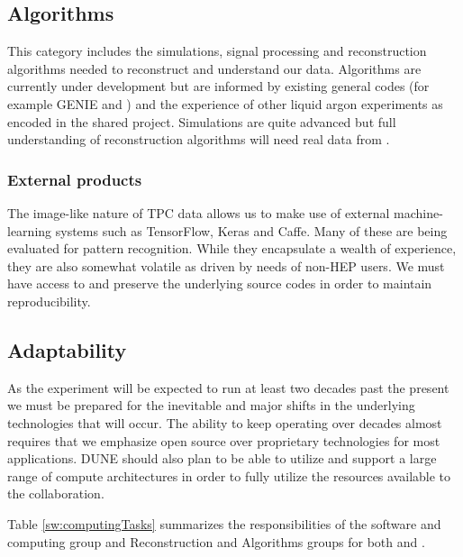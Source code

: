 \subsection{Algorithms}
This category includes the simulations, signal processing and reconstruction algorithms needed to reconstruct and understand our data. Algorithms are currently under development but are  informed by existing general codes (for example GENIE and ) and the experience of other liquid argon experiments as encoded in the shared   project.  Simulations are quite advanced but full understanding of reconstruction algorithms will need real data from . 

\subsubsection{External products}
The image-like nature of TPC data allows us to make use of external machine-learning systems such as TensorFlow\cite{DBLP:journals/corr/AbadiABBCCCDDDG16}, 
Keras\cite{chollet2015keras} and Caffe\cite{Jia:2014:CCA:2647868.2654889}.  Many of these are being evaluated for pattern recognition. While they encapsulate a wealth of experience, they are also somewhat volatile as driven by needs of non-HEP users.  We must have access to and preserve the underlying source codes in order to maintain reproducibility. 



\subsection{Adaptability}
As the experiment will be expected to run at least two decades past the present we must be prepared for the inevitable and major shifts in the underlying technologies that will occur. The ability to keep operating over decades almost requires that we emphasize open source over proprietary technologies for most applications.  DUNE should also plan to be able to utilize and support a large range of compute architectures in order to fully utilize the resources available to the collaboration.


Table \ref{sw:computingTasks} summarizes the responsibilities of the software and computing group and Reconstruction and Algorithms groups for both  and .

